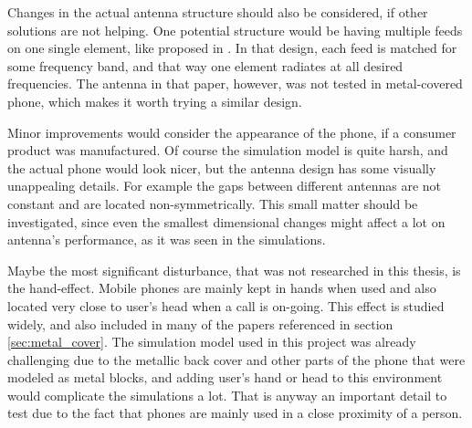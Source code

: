Changes in the actual antenna structure should also be considered, if other solutions are not helping. One potential structure would be having multiple feeds on one single element, like proposed in \cite{valkonen_multifeed}. In that design, each feed is matched for some frequency band, and that way one element radiates at all desired frequencies. The antenna in that paper, however, was not tested in metal-covered phone, which makes it worth trying a similar design.

Minor improvements would consider the appearance of the phone, if a consumer product was manufactured. Of course the simulation model is quite harsh, and the actual phone would look nicer, but the antenna design has some visually unappealing details. For example the gaps between different antennas are not constant and are located non-symmetrically. This small matter should be investigated, since even the smallest dimensional changes might affect a lot on antenna's performance, as it was seen in the simulations.

Maybe the most significant disturbance, that was not researched in this thesis, is the hand-effect. Mobile phones are mainly kept in hands when used and also located very close to user's head when a call is on-going. This effect is studied widely, and also included in many of the papers referenced in section \ref{sec:metal_cover}. The simulation model used in this project was already challenging due to the metallic back cover and other parts of the phone that were modeled as metal blocks, and adding user's hand or head to this environment would complicate the simulations a lot. That is anyway an important detail to test due to the fact that phones are mainly used in a close proximity of a person.


\clearpage
